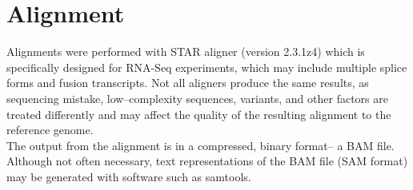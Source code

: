 \documentclass{article}
\begin{document}
\section{Alignment}
Alignments were performed with STAR aligner  (version 2.3.1z4) \cite{star} which is specifically designed for RNA-Seq experiments, which may include multiple splice forms and fusion transcripts.  Not all aligners produce the same results, as sequencing mistake, low--complexity sequences, variants, and other factors are treated differently and may affect the quality of the resulting alignment to the reference genome.\\

The output from the alignment is in a compressed, binary format-- a BAM file.  Although not often necessary, text representations of the BAM file (SAM format) may be generated with software such as samtools.\\
\end{document}
